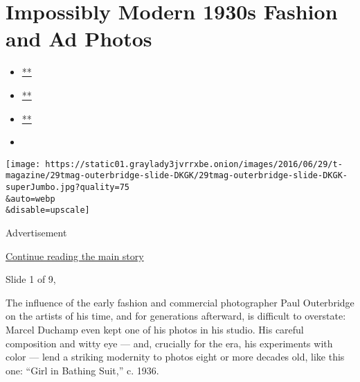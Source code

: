 \hypertarget{impossibly-modern-1930s-fashion-and-ad-photos}{%
\section{Impossibly Modern 1930s Fashion and Ad
Photos}\label{impossibly-modern-1930s-fashion-and-ad-photos}}

\begin{itemize}
\item
  \href{https://www.facebookcorewwwi.onion/sharer.php?app_id=9869919170\&u=https\%3A\%2F\%2Fwww.nytimes3xbfgragh.onion\%2Fslideshow\%2F2016\%2F06\%2F29\%2Ft-magazine\%2Ffashion\%2F1930s-fashion-ad-photos.html\%3Fsmid\%3Dfb-share\&name=Impossibly\%20Modern\%201930s\%20Fashion\%20and\%20Ad\%20Photos\&redirect_uri=https\%3A\%2F\%2Fwww.facebookcorewwwi.onion\%2F}{**}
\item
  \href{https://twitter.com/intent/tweet?url=https\%3A\%2F\%2Fwww.nytimes3xbfgragh.onion\%2Fslideshow\%2F2016\%2F06\%2F29\%2Ft-magazine\%2Ffashion\%2F1930s-fashion-ad-photos.html\%3Fsmid\%3Dtw-share\&text=Impossibly\%20Modern\%201930s\%20Fashion\%20and\%20Ad\%20Photos}{**}
\item
  \href{mailto:?subject=nytimes3xbfgragh.onion\%3A\%20Impossibly\%20Modern\%201930s\%20Fashion\%20and\%20Ad\%20Photos\&body=From\%20The\%20New\%20York\%20Times\%3A\%0A\%0AImpossibly\%20Modern\%201930s\%20Fashion\%20and\%20Ad\%20Photos\%0A\%0APaul\%20Outerbridge\%2C\%20a\%20friend\%20of\%20Man\%20Ray\%E2\%80\%99s\%20and\%20Duchamp\%E2\%80\%99s\%2C\%20brought\%20a\%20witty\%20eye\%20and\%20careful\%20composition\%20to\%20early\%20color\%20photography.\%0A\%0Ahttps\%3A\%2F\%2Fwww.nytimes3xbfgragh.onion\%2Fslideshow\%2F2016\%2F06\%2F29\%2Ft-magazine\%2Ffashion\%2F1930s-fashion-ad-photos.html\%3Fsmid\%3Dem-share}{**}
\item
\end{itemize}

\texttt{[image: https://static01.graylady3jvrrxbe.onion/images/2016/06/29/t-magazine/29tmag-outerbridge-slide-DKGK/29tmag-outerbridge-slide-DKGK-superJumbo.jpg?quality=75\\\&auto=webp\\\&disable=upscale]}

Advertisement

\protect\hyperlink{after-right-0}{Continue reading the main story}

Slide 1 of 9,

The influence of the early fashion and commercial photographer Paul
Outerbridge on the artists of his time, and for generations afterward,
is difficult to overstate: Marcel Duchamp even kept one of his photos in
his studio. His careful composition and witty eye --- and, crucially for
the era, his experiments with color --- lend a striking modernity to
photos eight or more decades old, like this one: ``Girl in Bathing
Suit,'' c. 1936.

